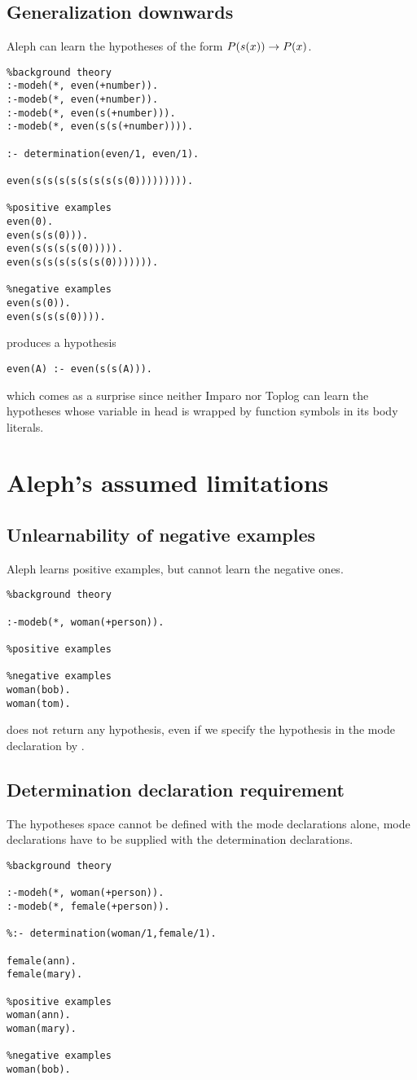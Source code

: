 \subsection{Generalization downwards}
Aleph can learn the hypotheses of the form $P(s(x)) \to P(x)$.

\begin{lstlisting}
%background theory
:-modeh(*, even(+number)).
:-modeb(*, even(+number)).
:-modeb(*, even(s(+number))).
:-modeb(*, even(s(s(+number)))).

:- determination(even/1, even/1).

even(s(s(s(s(s(s(s(s(0))))))))).

%positive examples
even(0).
even(s(s(0))).
even(s(s(s(s(0))))).
even(s(s(s(s(s(s(0))))))).

%negative examples
even(s(0)).
even(s(s(s(0)))).
\end{lstlisting}
produces a hypothesis
\begin{lstlisting}
even(A) :- even(s(s(A))).
\end{lstlisting}
which comes as a surprise since neither Imparo nor Toplog can learn the hypotheses whose variable in head is wrapped by function symbols in its body literals.

\section{Aleph's assumed limitations}
\subsection{Unlearnability of negative examples}
Aleph learns positive examples, but cannot learn the negative ones.
\begin{lstlisting}
%background theory

:-modeb(*, woman(+person)).

%positive examples

%negative examples
woman(bob).
woman(tom).
\end{lstlisting}
does not return any hypothesis, even if we specify the hypothesis in the mode declaration by .

\subsection{Determination declaration requirement}
The hypotheses space cannot be defined with the mode declarations alone, mode declarations have to be supplied with the determination declarations.
\begin{lstlisting}
%background theory

:-modeh(*, woman(+person)).
:-modeb(*, female(+person)).

%:- determination(woman/1,female/1).

female(ann).
female(mary).

%positive examples
woman(ann).
woman(mary).

%negative examples
woman(bob).
\end{lstlisting}

